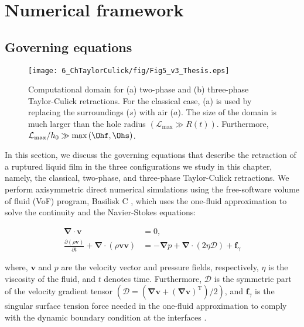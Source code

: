 \section{Numerical framework}\label{Ch6:sec::Num method}
\subsection{Governing equations}

\begin{figure}
	\centering
	\texttt{[image: 6\_ChTaylorCulick/fig/Fig5\_v3\_Thesis.eps]}	
	\caption{Computational domain for (a) two-phase and (b) three-phase Taylor-Culick retractions. For the classical case, (a) is used by replacing the surroundings ($s$) with air ($a$). The size of the domain is much larger than the hole radius $(\mathcal{L}_\text{max} \gg R(t))$. Furthermore, $\mathcal{L}_\text{max}/h_0 \gg \text{max}\left(\Ohf, \Ohs\right)$.}
	\label{Ch6:fig:NumericalSetup}
\end{figure}

In this section, we discuss the governing equations that describe the retraction of a ruptured liquid film in the three configurations we study in this chapter, namely, the classical, two-phase, and three-phase Taylor-Culick retractions. We perform axisymmetric direct numerical simulations using the free-software volume of fluid (VoF) program, Basilisk C \citep{basiliskpopinet1, basiliskvatsaltc}, which uses the one-fluid approximation \citep{prosperetti2009computational, tryggvason2011direct} to solve the continuity and the Navier-Stokes equations:

\begin{align}
	\label{Ch6:Eqn::continuity}
	\boldsymbol{\nabla\cdot v} &= 0,\\ 
	\label{Ch6:Eqn::NS}
	\frac{\partial \left(\rho\boldsymbol{v}\right)}{\partial t} + \boldsymbol{\nabla\cdot}\left(\rho\boldsymbol{vv}\right) &= -\boldsymbol{\nabla} p + \boldsymbol{\nabla\cdot}\left(2\eta\boldsymbol{\mathcal{D}}\right) + \boldsymbol{f}_\gamma
\end{align}

\noindent where, $\boldsymbol{v}$ and $p$ are the velocity vector and pressure fields, respectively, $\eta$ is the viscosity of the fluid, and $t$ denotes time. Furthermore, $\boldsymbol{\mathcal{D}}$ is the symmetric part of the velocity gradient tensor $\left(\boldsymbol{\mathcal{D}} = \left(\boldsymbol{\nabla v} + \left(\boldsymbol{\nabla v}\right)^{\text{T}}\right)/2\right)$, and $\boldsymbol{f}_\gamma$ is the singular surface tension force needed in the one-fluid approximation to comply with the dynamic boundary condition at the interfaces \citep{brackbill1992continuum}. 

